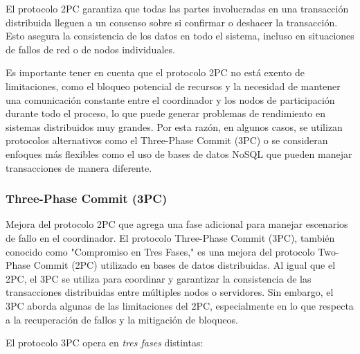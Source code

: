 El protocolo 2PC garantiza que todas las partes involucradas en una transacción distribuida lleguen a un consenso sobre si confirmar o deshacer la transacción. Esto asegura la consistencia de los datos en todo el sistema, incluso en situaciones de fallos de red o de nodos individuales.

Es importante tener en cuenta que el protocolo 2PC no está exento de limitaciones, como el bloqueo potencial de recursos y la necesidad de mantener una comunicación constante entre el coordinador y los nodos de participación durante todo el proceso, lo que puede generar problemas de rendimiento en sistemas distribuidos muy grandes. Por esta razón, en algunos casos, se utilizan protocolos alternativos como el Three-Phase Commit (3PC) o se consideran enfoques más flexibles como el uso de bases de datos NoSQL que pueden manejar transacciones de manera diferente.

\subsubsection{Three-Phase Commit (3PC)}
\noindent
Mejora del protocolo 2PC que agrega una fase adicional para manejar escenarios de fallo en el coordinador.
El protocolo Three-Phase Commit (3PC), también conocido como "Compromiso en Tres Fases," es una mejora del protocolo Two-Phase Commit (2PC) utilizado en bases de datos distribuidas. Al igual que el 2PC, el 3PC se utiliza para coordinar y garantizar la consistencia de las transacciones distribuidas entre múltiples nodos o servidores. Sin embargo, el 3PC aborda algunas de las limitaciones del 2PC, especialmente en lo que respecta a la recuperación de fallos y la mitigación de bloqueos.

El protocolo 3PC opera en \textit{tres fases} distintas:

